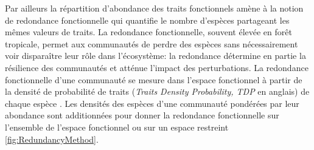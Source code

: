\documentclass[
  11pt,
  french,
  A4paper,
  extrafontsizes,onecolumn,openright
  ]{memoir}
\begin{document}
Par ailleurs la répartition d'abondance des traits fonctionnels amène à
la notion de redondance fonctionnelle qui quantifie le nombre d'espèces
partageant les mêmes valeurs de traits. La redondance fonctionnelle,
souvent élevée en forêt tropicale, permet aux communautés de perdre des
espèces sans nécessairement voir disparaître leur rôle dans
l'écosystème: la redondance détermine en partie la résilience des
communautés et atténue l'impact des perturbations. La redondance
fonctionnelle d'une communauté se mesure dans l'espace fonctionnel à
partir de la densité de probabilité de traits (\emph{Traits Density
Probability, TDP} en anglais) de chaque espèce \autocite{Carmona2016}.
Les densités des espèces d'une communauté pondérées par leur abondance
sont additionnées pour donner la redondance fonctionnelle sur l'ensemble
de l'espace fonctionnel ou sur un espace restreint
\ref{fig:RedundancyMethod}.
\end{document}
